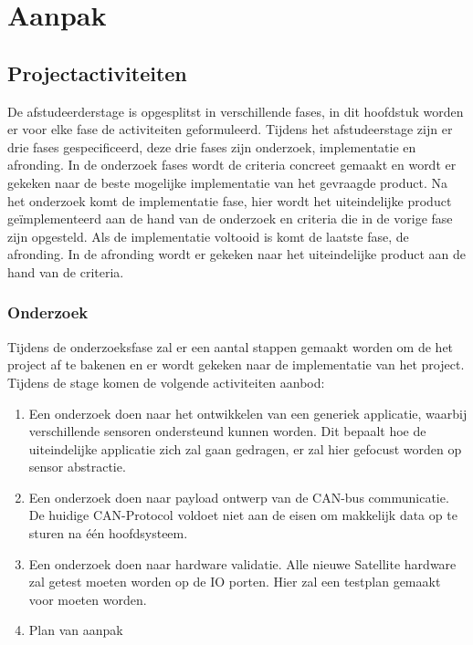\chapter{Aanpak} \label{ch:aanpak}

\section{Projectactiviteiten}
De afstudeerderstage is opgesplitst in verschillende fases, in dit hoofdstuk worden er voor elke fase de activiteiten geformuleerd. Tijdens het afstudeerstage zijn er drie fases gespecificeerd, deze drie fases zijn onderzoek, implementatie en afronding. In de onderzoek fases wordt de criteria concreet gemaakt en wordt er gekeken naar de beste mogelijke implementatie van het gevraagde product. Na het onderzoek komt de implementatie fase, hier wordt het uiteindelijke product geïmplementeerd aan de hand van de onderzoek en criteria die in de vorige fase zijn opgesteld. Als de implementatie voltooid is komt de laatste fase, de afronding. In de afronding wordt er gekeken naar het uiteindelijke product aan de hand van de criteria.

\subsection{Onderzoek}
Tijdens de onderzoeksfase zal er een aantal stappen gemaakt worden om de het project af te bakenen en er wordt gekeken naar de implementatie van het project. Tijdens de stage komen de volgende activiteiten aanbod:
\begin{enumerate}
	\item Een onderzoek doen naar het ontwikkelen van een generiek applicatie, waarbij verschillende sensoren ondersteund kunnen worden. Dit bepaalt hoe de uiteindelijke applicatie zich zal gaan gedragen, er zal hier gefocust worden op sensor abstractie.
	\item Een onderzoek doen naar payload ontwerp van de CAN-bus communicatie. De huidige CAN-Protocol voldoet niet aan de eisen om makkelijk data op te sturen na één hoofdsysteem.
	\item Een onderzoek doen naar hardware validatie. Alle nieuwe Satellite hardware zal getest moeten worden op de IO porten. Hier zal een testplan gemaakt voor moeten worden.
	\item Plan van aanpak
\end{enumerate}

